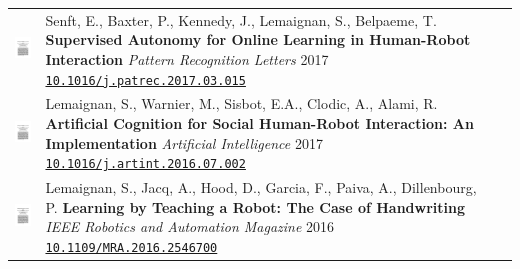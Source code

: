 \documentclass[11pt]{report}
\begin{document}
\begin{tabular}{p{1.8cm}p{6cm}p{7cm}}
    \vspace{0cm}\includegraphics[width=2cm]{thumbs/2019-science.jpg} &

    Senft, E., Baxter, P., Kennedy, J., Lemaignan, S., Belpaeme, T.
    \textbf{Supervised Autonomy for Online Learning in Human-Robot Interaction}
    \newline \textit{Pattern Recognition Letters} 2017
    \newline \texttt{\href{https://doi.org/10.1016/j.patrec.2017.03.015}{10.1016/j.patrec.2017.03.015}}
    & \small \\


    \vspace{0cm}\includegraphics[width=2cm]{thumbs/2019-science.jpg} &

    Lemaignan, S., Warnier, M., Sisbot, E.A., Clodic, A., Alami, R.
    \textbf{Artificial Cognition for Social Human-Robot Interaction: An Implementation}
    \newline \textit{Artificial Intelligence} 2017
    \newline \texttt{\href{https://doi.org/10.1016/j.artint.2016.07.002}{10.1016/j.artint.2016.07.002}}
    & \small \\


    \vspace{0cm}\includegraphics[width=2cm]{thumbs/2019-science.jpg} &

    Lemaignan, S., Jacq, A., Hood, D., Garcia, F., Paiva, A., Dillenbourg, P.
    \textbf{Learning by Teaching a Robot: The Case of Handwriting}
    \newline \textit{IEEE Robotics and Automation Magazine} 2016
    \newline \texttt{\href{https://doi.org/10.1109/MRA.2016.2546700}{10.1109/MRA.2016.2546700}}
    & \small \\



\end{tabular}
\end{document}
